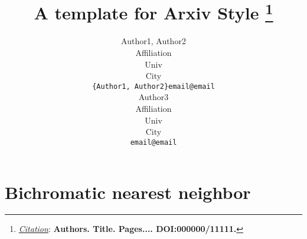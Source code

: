 \documentclass{article}
\title{A template for Arxiv Style
\thanks{\textit{\underline{Citation}}: 
\textbf{Authors. Title. Pages.... DOI:000000/11111.}} 
}
\author{
  Author1, Author2 \\
  Affiliation \\
  Univ \\
  City\\
  \texttt{\{Author1, Author2\}email@email} \\
   \And
  Author3 \\
  Affiliation \\
  Univ \\
  City\\
  \texttt{email@email} \\
}
\newcommand{\ignore}[1]{}
\begin{document}
\maketitle


\begin{abstract}
\lipsum[1]
\end{abstract}



 


\section{Bichromatic nearest neighbor}
\ignore{
\begin{itemize}
\item
\href{https://www.cs.umd.edu/class/fall2019/cmsc420-0201/Lects/lect14-kd-query.pdf}{k-d tree, worst case}
\item
\href{https://arxiv.org/pdf/1903.04936.pdf}{k-d tree, expected $O\left(2^d + \log n\right)$}
\item
\href{https://math.mit.edu/~shor/18.310/huffman.pdf}{Huffman encoding}
\item
\href{https://cstheory.stackexchange.com/questions/27499/bichromatic-all-nearest-neighbors}{Closest bichromatic pair}
\item
\href{https://www.cs.umd.edu/~nick/papers/nnpaper.pdf}{Nearest Neighbor search}
\item
\href{https://arxiv.org/pdf/2110.10283.pdf}{Lower bounds on Nearest Neighbor search}
\item
\href{https://www.cs.sbg.ac.at/~forster/courses/polycomp/slides/polycomp02.pdf}{SETH and OVH}
\item
\href{https://codeforces.com/blog/entry/45583}{codeforces}
\item $\mathbb{R}^2$ with $L_1$ metric
\href{https://stackoverflow.com/questions/8230929/bichromatic-closest-pair-when-r-and-b-are-separated-by-a-vertical-line-continue}{Post 1} and 
\href{https://stackoverflow.com/questions/8203576/closest-distance-between-two-pointsdisjoint-set}{Post 2} (maybe extendable to general metric using convex hull)
\item
\href{https://cp-algorithms.com/geometry/nearest_points.html#algorithm}{Nearest pair of points Competitive Programming}
\item
\href{http://web.onda.com.br/abveiga/capitulo14-ingles.pdf}{More Huffman-like trees}
\href{file:///C:/Users/tprusina/Downloads/forst2005.pdf}{Thorup et al}.
\end{itemize}

}
\end{document}
